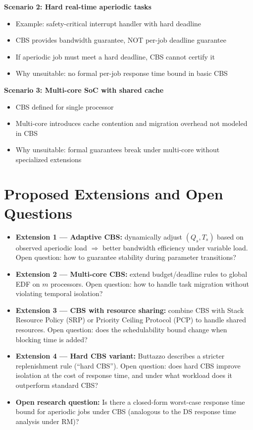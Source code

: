 \documentclass[conference]{IEEEtran}
\begin{document}
\textbf{Scenario 2: Hard real-time aperiodic tasks}
\begin{itemize}
  \item Example: safety-critical interrupt handler with hard deadline
  \item CBS provides bandwidth guarantee, NOT per-job deadline guarantee
  \item If aperiodic job must meet a hard deadline, CBS cannot certify it
  \item Why unsuitable: no formal per-job response time bound in basic CBS
\end{itemize}

\textbf{Scenario 3: Multi-core SoC with shared cache}
\begin{itemize}
  \item CBS defined for single processor
  \item Multi-core introduces cache contention and migration overhead
        not modeled in CBS
  \item Why unsuitable: formal guarantees break under multi-core
        without specialized extensions
\end{itemize}

\section{Proposed Extensions and Open Questions}

\begin{itemize}
  \item \textbf{Extension 1 — Adaptive CBS:}
        dynamically adjust $(Q_s, T_s)$ based on observed aperiodic
        load $\Rightarrow$ better bandwidth efficiency under variable load.
        Open question: how to guarantee stability during parameter transitions?

  \item \textbf{Extension 2 — Multi-core CBS:}
        extend budget/deadline rules to global EDF on $m$ processors.
        Open question: how to handle task migration without violating
        temporal isolation?

  \item \textbf{Extension 3 — CBS with resource sharing:}
        combine CBS with Stack Resource Policy (SRP) or Priority Ceiling
        Protocol (PCP) to handle shared resources.
        Open question: does the schedulability bound change when
        blocking time is added?

  \item \textbf{Extension 4 — Hard CBS variant:}
        Buttazzo describes a stricter replenishment rule (``hard CBS'').
        Open question: does hard CBS improve isolation at the cost of
        response time, and under what workload does it outperform
        standard CBS?

  \item \textbf{Open research question:}
        Is there a closed-form worst-case response time bound for
        aperiodic jobs under CBS (analogous to the DS response time
        analysis under RM)?
\end{itemize}
\end{document}
